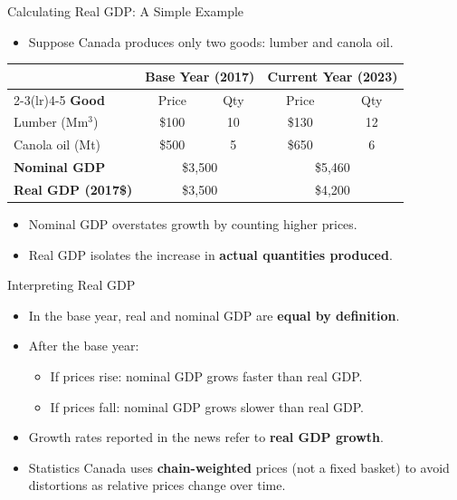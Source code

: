 \documentclass[aspectratio=169]{beamer}
\begin{document}
\begin{frame}{Calculating Real GDP: A Simple Example}
\transfade
\small
\begin{itemize}
  \item Suppose Canada produces only two goods: lumber and canola oil.
\end{itemize}
\vspace{0.3em}
\renewcommand{\arraystretch}{1.3}
\begin{tabular}{lcccc}
\toprule
 & \multicolumn{2}{c}{\textbf{Base Year (2017)}} & \multicolumn{2}{c}{\textbf{Current Year (2023)}} \\
\cmidrule(lr){2-3}\cmidrule(lr){4-5}
\textbf{Good} & Price & Qty & Price & Qty \\
\midrule
Lumber (M$\text{m}^3$) & \$100 & 10 & \$130 & 12 \\
Canola oil (Mt) & \$500 & 5 & \$650 & 6 \\
\midrule
\textbf{Nominal GDP} & \multicolumn{2}{c}{\$3,500} & \multicolumn{2}{c}{\textcolor{canadared}{\$5,460}} \\
\textbf{Real GDP (2017\$)} & \multicolumn{2}{c}{\$3,500} & \multicolumn{2}{c}{\textcolor{accent}{\$4,200}} \\
\bottomrule
\end{tabular}
\begin{itemize}
  \item Nominal GDP overstates growth by counting higher prices.
  \item Real GDP isolates the increase in \textbf{actual quantities produced}.
\end{itemize}
\end{frame}

\begin{frame}{Interpreting Real GDP}
\transfade
\begin{itemize}
  \item In the base year, real and nominal GDP are \textbf{equal by definition}.
  \item After the base year:
  \begin{itemize}
    \item If prices rise: nominal GDP grows \alert{faster} than real GDP.
    \item If prices fall: nominal GDP grows \alert{slower} than real GDP.
  \end{itemize}
  \item Growth rates reported in the news refer to \textbf{real GDP growth}.
  \item Statistics Canada uses \textbf{chain-weighted} prices (not a fixed basket) to avoid distortions as relative prices change over time.
\end{itemize}
\end{frame}
\end{document}
